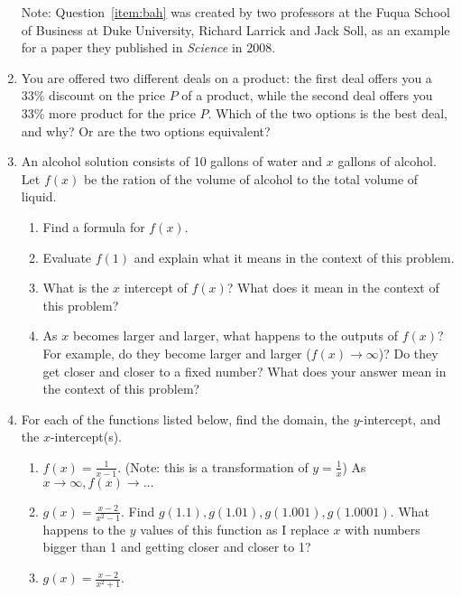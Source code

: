 \documentclass[11pt,dvipsnames]{article}
\begin{document}
\begin{enumerate}[label= {\bf  \arabic*:}]
Note: Question~\ref{item:bah} was created by two professors at the Fuqua School of Business at Duke University, Richard Larrick and Jack Soll, as an example for a paper they published in {\emph{Science}} in 2008.
\item  You are offered two different deals on a product: the first deal offers you a 33\% discount on the price $P$ of a product, while the second deal offers you 33\% more product  for the price $P$. Which of the two options is the best deal, and why? Or are the two options equivalent?
\item An alcohol solution consists of 10 gallons of water and $x$ gallons of alcohol. Let $f(x)$ be the ration of the volume of alcohol to the total volume of liquid.
\begin{enumerate}
	\item Find a formula for $f(x)$.
	\item  Evaluate $f(1)$ and explain what it means in the context of this problem.
	\item What is the $x$ intercept of $f(x)$? What does it mean in the context of this problem?
	\item As $x$ becomes larger and larger, what happens to the outputs of $f(x)$? For example, do they become larger and larger ($f(x)\to \infty$)? Do they get closer and closer to a fixed number? What does your answer mean in the context of this problem?
	
\end{enumerate}
\item For each of the functions listed below, find the domain, the $y$-intercept, and the $x$-intercept(s). 
\begin{enumerate}
	\item $\displaystyle f(x)=\frac{1}{x-1}$. (Note: this is a transformation of $\displaystyle y=\frac{1}{x}$) As $x\to \infty, f(x)\to \ldots$
	\item $\displaystyle g(x)=\frac{x-2}{x^2-1}$.  Find $g(1.1), g(1.01), g(1.001), g(1.0001)$. What happens to the $y$ values of this function as I replace $x$ with numbers bigger than 1 and getting closer and closer to 1?
	\item $\displaystyle g(x)=\frac{x-2}{x^2+1}$.
	
\end{enumerate}
\end{enumerate}
\end{document}
